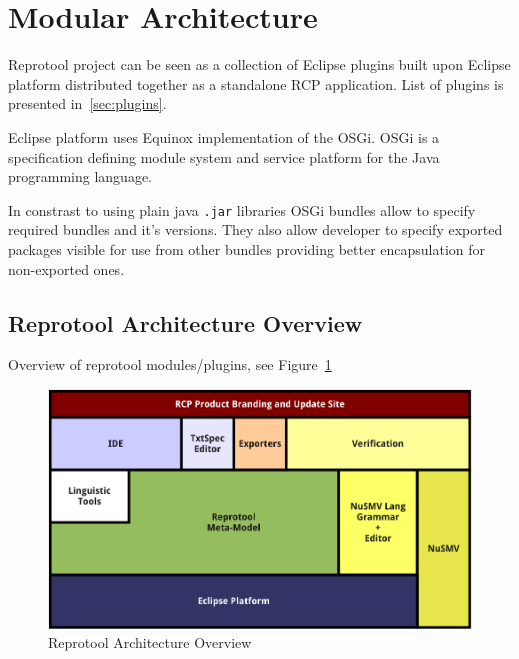 \section{Modular Architecture}
Reprotool project can be seen as a collection of Eclipse plugins built upon Eclipse platform distributed together as a standalone RCP application.
List of plugins is presented in~\ref{sec:plugins}.

Eclipse platform uses Equinox implementation of the OSGi. OSGi is a specification defining module system and service platform for the Java programming language.

In constrast to using plain java \verb|.jar| libraries OSGi bundles allow to specify required bundles and it's versions. They also allow developer to specify exported packages visible for use from other bundles providing better encapsulation for non-exported ones.

	


\subsection{Reprotool Architecture Overview}
Overview of reprotool modules/plugins, see Figure~\ref{fig:ArchitectureOverview}
	
\begin{figure}[ht]
  \centering
  \includegraphics[width=\textwidth]{images/ArchitectureOverview}
  \caption{Reprotool Architecture Overview}
  \label{fig:ArchitectureOverview}
\end{figure}

